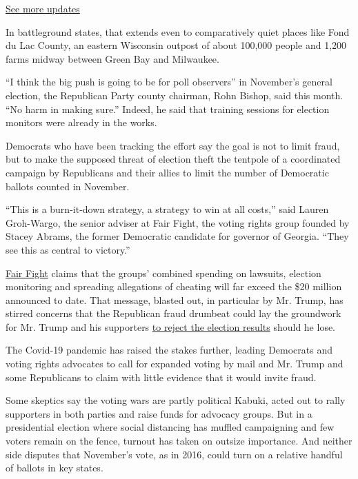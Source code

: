 \href{https://www.nytimes3xbfgragh.onion/2020/08/04/us/elections/primary-election-michigan-arizona-kansas.html?action=click\&pgtype=Article\&state=default\&region=MAIN_CONTENT_1\&context=storylines_live_updates}{See
more updates}

In battleground states, that extends even to comparatively quiet places
like Fond du Lac County, an eastern Wisconsin outpost of about 100,000
people and 1,200 farms midway between Green Bay and Milwaukee.

``I think the big push is going to be for poll observers'' in November's
general election, the Republican Party county chairman, Rohn Bishop,
said this month. ``No harm in making sure.'' Indeed, he said that
training sessions for election monitors were already in the works.

Democrats who have been tracking the effort say the goal is not to limit
fraud, but to make the supposed threat of election theft the tentpole of
a coordinated campaign by Republicans and their allies to limit the
number of Democratic ballots counted in November.

``This is a burn-it-down strategy, a strategy to win at all costs,''
said Lauren Groh-Wargo, the senior adviser at Fair Fight, the voting
rights group founded by Stacey Abrams, the former Democratic candidate
for governor of Georgia. ``They see this as central to victory.''

\href{https://fairfight.com/fair-fight-2020/}{Fair Fight} claims that
the groups' combined spending on lawsuits, election monitoring and
spreading allegations of cheating will far exceed the \$20 million
announced to date. That message, blasted out, in particular by Mr.
Trump, has stirred concerns that the Republican fraud drumbeat could lay
the groundwork for Mr. Trump and his supporters
\href{https://www.washingtonpost.com/opinions/2020/05/14/we-need-prepare-possibility-trump-rejecting-election-results/}{to
reject the election results} should he lose.

The Covid-19 pandemic has raised the stakes further, leading Democrats
and voting rights advocates to call for expanded voting by mail and Mr.
Trump and some Republicans to claim with little evidence that it would
invite fraud.

Some skeptics say the voting wars are partly political Kabuki, acted out
to rally supporters in both parties and raise funds for advocacy groups.
But in a presidential election where social distancing has muffled
campaigning and few voters remain on the fence, turnout has taken on
outsize importance. And neither side disputes that November's vote, as
in 2016, could turn on a relative handful of ballots in key states.

